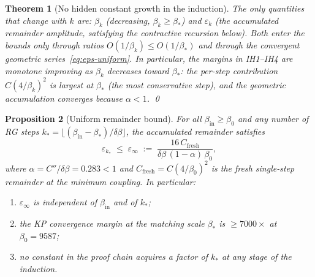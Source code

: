 \documentclass[11pt]{article}
\newtheorem{theorem}{Theorem}[section]
\newtheorem{proposition}[theorem]{Proposition}
\theoremstyle{definition}
\begin{document}
\begin{theorem}[No hidden constant growth in the induction]
The only quantities that change with $k$ are:
$\beta_k$ \textup{(}decreasing, $\beta_k\ge\beta_*$\textup{)}
and $\varepsilon_k$ \textup{(}the accumulated remainder amplitude,
satisfying the contractive recursion below\textup{)}.
Both enter the bounds only through ratios
$O(1/\beta_k)\le O(1/\beta_*)$ and through the convergent
geometric series~\eqref{eq:eps-uniform}.
In particular, the \emph{margins} in IH1--IH4 are \emph{monotone
improving} as $\beta_k$ decreases toward $\beta_*$:
the per-step contribution $C(4/\beta_k)^2$ is largest at $\beta_*$
\textup{(}the most conservative step\textup{)}, and the geometric
accumulation converges because $\alpha<1$.
\qed
\end{theorem}

\begin{proposition}[Uniform remainder bound]%
\label{prop:remainder-uniform}
For all $\beta_{\mathrm{in}}\ge\beta_0$ and any number of RG
steps $k_*=\lfloor(\beta_{\mathrm{in}}-\beta_*)/\delta\beta\rfloor$,
the accumulated remainder satisfies
\begin{equation}\label{eq:eps-uniform}
\varepsilon_{k_*}\;\le\;\varepsilon_\infty
\;:=\;\frac{16\,C_{\mathrm{fresh}}}
{\delta\beta\,(1-\alpha)\,\beta_0},
\end{equation}
where $\alpha=C''/\delta\beta=0.283<1$ and
$C_{\mathrm{fresh}}=C(4/\beta_0)^2$ is the fresh
single-step remainder at the minimum coupling.
In particular:
\begin{enumerate}[nosep,label=(\roman*)]
\item $\varepsilon_\infty$ is independent of
$\beta_{\mathrm{in}}$ and of $k_*$;
\item the KP convergence margin at the matching
scale $\beta_*$ is $\ge 7000\times$ at $\beta_0=9587$;
\item no constant in the proof chain acquires a factor
of $k_*$ at any stage of the induction.
\end{enumerate}
\end{proposition}
\end{document}
